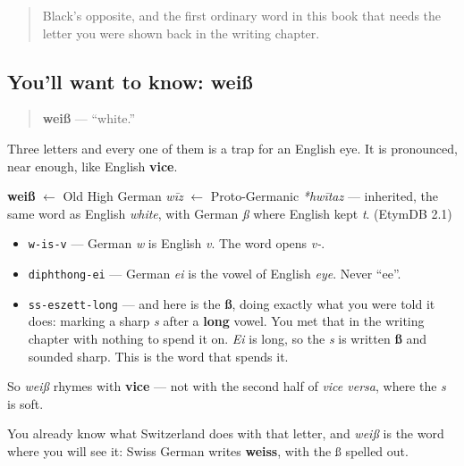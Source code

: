 \label{lesson:GE-C13-weiss}



\begin{quote}
Black's opposite, and the first ordinary word in this book that needs the letter you were shown back in the writing chapter.
\end{quote}

\subsection*{You'll want to know: weiß}
\begin{quote}
\textbf{weiß} — \textquotedblleft{}white.\textquotedblright{}
\end{quote}

Three letters and every one of them is a trap for an English eye. It is pronounced, near enough, like English \textbf{vice}.

\begin{cousinweb}
\textbf{weiß} $\leftarrow$ Old High German \emph{wīz} $\leftarrow$ Proto-Germanic \emph{*hwītaz} — inherited, the same word as English \emph{white}, with German \emph{ß} where English kept \emph{t}. (EtymDB 2.1)
\end{cousinweb}

\begin{sounds}
\begin{itemize}
\raggedright
  \item \texttt{w-is-v} — German \emph{w} is English \emph{v}. The word opens \emph{v-}.
  \item \texttt{diphthong-ei} — German \emph{ei} is the vowel of English \emph{eye}. Never \textquotedblleft{}ee\textquotedblright{}.
  \item \texttt{ss-eszett-long} — and here is the \textbf{ß}, doing exactly what you were told it does: marking a sharp \emph{s} after a \textbf{long} vowel. You met that in the writing chapter with nothing to spend it on. \emph{Ei} is long, so the \emph{s} is written \textbf{ß} and sounded sharp. This is the word that spends it.
\end{itemize}

So \emph{weiß} rhymes with \textbf{vice} — not with the second half of \emph{vice versa}, where the \emph{s} is soft.

You already know what Switzerland does with that letter, and \emph{weiß} is the word where you will see it: Swiss German writes \textbf{weiss}, with the ß spelled out.
\end{sounds}

